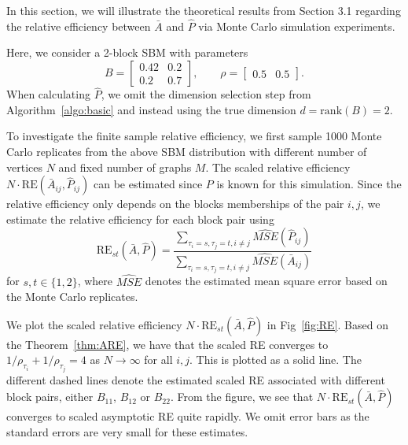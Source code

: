\documentclass[10pt,letterpaper]{article}
\begin{document}
In this section, we will illustrate the theoretical results from Section 3.1 regarding the relative efficiency between $\bar{A}$ and $\hat{P}$ via Monte Carlo simulation experiments.

Here, we consider a 2-block SBM with parameters
\begin{equation*}
B = \begin{bmatrix}
0.42 & 0.2 \\
0.2 & 0.7
\end{bmatrix}
,\qquad \rho = \begin{bmatrix}
0.5 & 0.5
\end{bmatrix}.
\end{equation*}
When calculating $\hat{P}$, we omit the dimension selection step from Algorithm~\ref{algo:basic} and instead using the true dimension $d = \mathrm{rank}(B) = 2$.

To investigate the finite sample relative efficiency, we first sample 1000 Monte Carlo replicates from the above SBM distribution with different number of vertices $N$ and fixed number of graphs $M$. The scaled relative efficiency $N \cdot \mathrm{RE}(\bar{A}_{ij}, \hat{P}_{ij})$ can be estimated since $P$ is known for this simulation. Since the relative efficiency only depends on the blocks memberships of the pair $i,j$, we estimate the relative efficiency for each block pair using
\[
    \mathrm{RE}_{st}(\bar{A},\hat{P}) = \frac{\sum_{\tau_i=s,\tau_j=t,i \ne j} \widehat{MSE}(\hat{P}_{ij})}{\sum_{\tau_i=s,\tau_j=t,i \ne j} \widehat{MSE}(\bar{A}_{ij})}
\]
for $s,t\in\{1,2\}$, where $\hat{MSE}$ denotes the estimated mean square error based on the Monte Carlo replicates.

We plot the scaled relative efficiency $N \cdot \mathrm{RE}_{st}(\bar{A},\hat{P})$ in Fig~\ref{fig:RE}. 
Based on the Theorem~\ref{thm:ARE}, we have that the scaled RE converges to $1/\rho_{\tau_i}+1/\rho_{\tau_j}=4$ as $N\to\infty$ for all $i,j$.
This is plotted as a solid line.
The different dashed lines denote the estimated scaled RE associated with different block pairs, either $B_{11}$, $B_{12}$ or $B_{22}$. 
From the figure, we see that $N \cdot \mathrm{RE}_{st}(\bar{A}, \hat{P})$ converges to scaled asymptotic RE quite rapidly.
We omit error bars as the standard errors are very small for these estimates.
\end{document}
